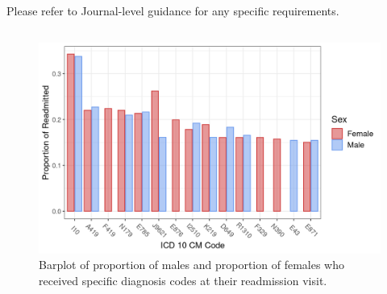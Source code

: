 \documentclass[sn-basic,pdflatex]{sn-jnl}
\theoremstyle{remark}
\theoremstyle{definition}
\begin{document}
Please refer to Journal-level guidance for any specific requirements.

\begin{appendices}

\hypertarget{secA}{%
\section{}\label{secA}}

\begin{figure}[H]

{\centering \includegraphics[width=1\linewidth]{figures/readmit_diags} 

}

\caption{Barplot of proportion of males and proportion of females who received specific diagnosis codes at their readmission visit.}\label{fig:readmit_diags}
\end{figure}

\end{appendices}


\end{document}
